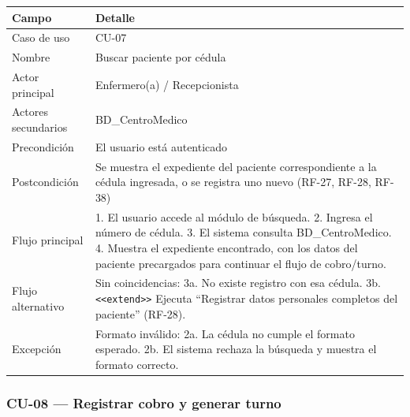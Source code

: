 \documentclass[11pt,a4paper]{article}
\begin{document}
	\begin{longtable}{p{} p{} }
		
		
		\toprule
		\textbf{Campo} &
		\textbf{Detalle}  \\
		\midrule
		\endhead
		
		Caso de uso & CU-07 \\
		Nombre & Buscar paciente por cédula \\
		Actor principal & Enfermero(a) / Recepcionista \\
		Actores secundarios & BD\_CentroMedico \\
		Precondición & El usuario está autenticado \\
		Postcondición & Se muestra el expediente del paciente correspondiente a la cédula ingresada, o se registra uno nuevo (RF-27, RF-28, RF-38) \\
		Flujo principal & 1. El usuario accede al módulo de búsqueda. 2. Ingresa el número de cédula. 3. El sistema consulta BD\_CentroMedico. 4. Muestra el expediente encontrado, con los datos del paciente precargados para continuar el flujo de cobro/turno. \\
		Flujo alternativo & Sin coincidencias: 3a. No existe registro con esa cédula. 3b. \texttt{<<extend>>} Ejecuta ``Registrar datos personales completos del paciente'' (RF-28). \\
		Excepción & Formato inválido: 2a. La cédula no cumple el formato esperado. 2b. El sistema rechaza la búsqueda y muestra el formato correcto. \\
		\bottomrule
	\end{longtable}
	
	\subsubsection{CU-08 --- Registrar cobro y generar turno}
	
\end{document}
